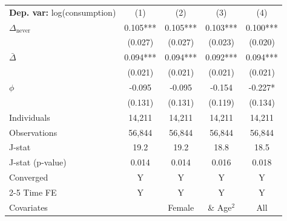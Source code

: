 \begin{tabular}{l cccc} \toprule  \textbf{Dep. var:}  log(consumption) 
                    &\multicolumn{1}{c}{(1)}   &\multicolumn{1}{c}{(2)}   &\multicolumn{1}{c}{(3)}   &\multicolumn{1}{c}{(4)}   \\

\addlinespace
$\Delta_{\text{never}}$&       0.105***&       0.105***&       0.103***&       0.100***\\
                    &     (0.027)   &     (0.027)   &     (0.023)   &     (0.020)   \\

\addlinespace
$\bar{\Delta}$      &       0.094***&       0.094***&       0.092***&       0.094***\\
                    &     (0.021)   &     (0.021)   &     (0.021)   &     (0.021)   \\

\addlinespace
$\phi$              &      -0.095   &      -0.095   &      -0.154   &      -0.227*  \\
                    &     (0.131)   &     (0.131)   &     (0.119)   &     (0.134)   \\
\addlinespace
Individuals         &      14,211   &      14,211   &      14,211   &      14,211   \\
Observations        &      56,844   &      56,844   &      56,844   &      56,844   \\
J-stat              &        19.2   &        19.2   &        18.8   &        18.5   \\
J-stat (p-value)    &       0.014   &       0.014   &       0.016   &       0.018   \\
Converged           &           Y   &           Y   &           Y   &           Y   \\
\cmidrule{2-5} Time FE & Y & Y & Y & Y \\ Covariates & & Female & \& Age$^2$ & All \\ \bottomrule \end{tabular}
